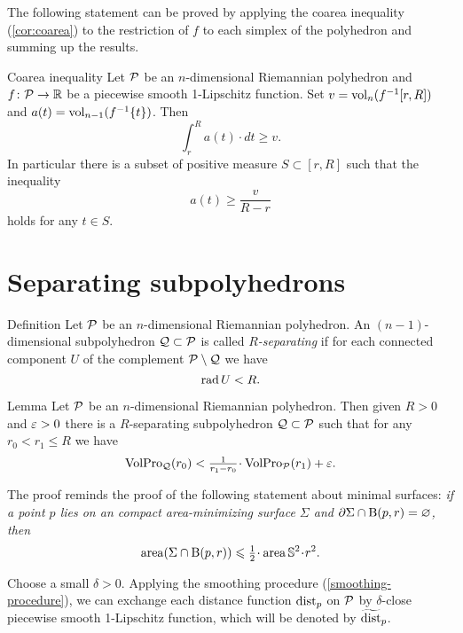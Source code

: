 The following statement can be proved by applying the coarea inequality (\ref{cor:coarea}) to the restriction of $f$ to each simplex of the polyhedron and summing up the results.

\begin{thm}{Coarea inequality}\label{poly-coarea}
Let $\mathcal{P}$ be an $n$-dimensional Riemannian polyhedron and $f\colon\mathcal{P}\to \mathbb{R}$ be a piecewise smooth 1-Lipschitz function.
Set $v\z=\vol_n (f^{-1}[r,R])$ and $a(t)=\operatorname{\rm vol}\nolimits_{n-1}(f^{-1}\{t\})$.
Then 
\[\int_r^Ra(t)\cdot dt\ge v .\]
In particular there is a subset of positive measure $S\subset [r,R]$ such that the inequality 
\[a(t)\ge \frac v{R-r}\]
holds for any $t\in S$.
\end{thm}

\section*{Separating subpolyhedrons}

\begin{thm}{Definition}
Let $\mathcal{P}$ be an $n$-dimensional Riemannian polyhedron.
An $(n-1)$-dimensional subpolyhedron $\mathcal{Q}\subset\mathcal{P}$ is called \emph{$R$-separating} if for each connected component $U$ of the complement $\mathcal{P}\setminus \mathcal{Q}$ we have 
\[\mathop{\rm rad}\nolimits U<R.\]

\end{thm}



\begin{thm}{Lemma}\label{lem:separating}
Let $\mathcal{P}$ be an $n$-dimensional Riemannian polyhedron.
Then given $R>0$ and $\varepsilon>0$ there is a $R$-separating subpolyhedron $\mathcal{Q}\subset\mathcal{P}$ such that for any $r_0<r_1\le R$ we have
\[\VolPro_{\spc{Q}}(r_0)< \tfrac1{r_1-r_0}\cdot \VolPro_{\spc{P}}(r_1)+\eps.\]

\end{thm}

The proof reminds the proof of the following statement about minimal surfaces: 
\textit{if a point $p$ lies on an compact area-minimizing surface $\Sigma$ and $\partial\Sigma \cap \mathrm{B}{}(p,r)=\varnothing$, then
\[\area(\Sigma\cap \oBall(p,r))\le \tfrac12\cdot \area\mathbb{S}^2\cdot r^2.\]
}


Choose a small $\delta>0$.
Applying the smoothing procedure (\ref{smoothing-procedure}), we can exchange each distance function $\mathrm{dist}_p$ on $\mathcal{P}$ by $\delta$-close piecewise smooth 1-Lipschitz function, which will be denoted by $\widetilde {\mathrm{dist}}_p$.

